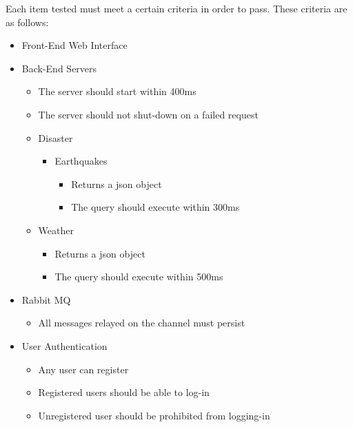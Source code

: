 Each item tested must meet a certain criteria in order to pass. These criteria are as follows:

\begin{itemize}

	\item Front-End Web Interface
			
	\item Back-End Servers
		\begin{itemize}
			\item The server should start within 400ms
			\item The server should not shut-down on a failed request
		\end{itemize}
		\begin{itemize}
			\item Disaster
				\begin{itemize}
					\item Earthquakes 
						\begin{itemize}
							\item Returns a json object
							\item The query should execute within 300ms
						\end{itemize}
				\end{itemize}
			\item Weather
				\begin{itemize}
							\item Returns a json object
							\item The query should execute within 500ms
						\end{itemize}
		\end{itemize}
		
	\item Rabbit MQ
		\begin{itemize}
			\item All messages relayed on the channel must persist
		\end{itemize}
	\item User Authentication
		\begin{itemize}
			\item Any user can register
			\item Registered users should be able to log-in
			\item Unregistered user should be prohibited from logging-in
		\end{itemize}
	
\end{itemize}